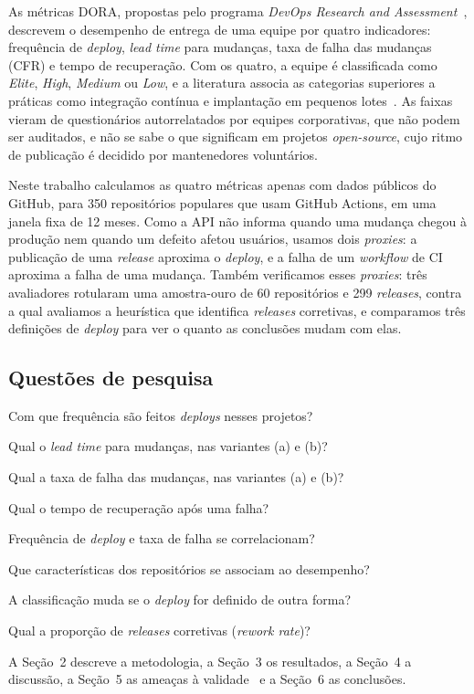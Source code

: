 
As métricas DORA, propostas pelo programa \textit{DevOps Research and
Assessment}~\cite{dora2024}, descrevem o desempenho de entrega de uma equipe por quatro
indicadores: frequência de \textit{deploy}, \textit{lead time} para mudanças, taxa de falha
das mudanças (CFR) e tempo de recuperação. Com os quatro, a equipe é classificada como
\textit{Elite}, \textit{High}, \textit{Medium} ou \textit{Low}, e a literatura associa as
categorias superiores a práticas como integração contínua e implantação em pequenos
lotes~\cite{forsgren2018}. As faixas vieram de questionários autorrelatados por equipes
corporativas, que não podem ser auditados, e não se sabe o que significam em projetos
\textit{open-source}, cujo ritmo de publicação é decidido por mantenedores voluntários.

Neste trabalho calculamos as quatro métricas apenas com dados públicos do GitHub, para 350
repositórios populares que usam GitHub Actions, em uma janela fixa de 12 meses. Como a API
não informa quando uma mudança chegou à produção nem quando um defeito afetou usuários,
usamos dois \textit{proxies}: a publicação de uma \textit{release} aproxima o
\textit{deploy}, e a falha de um \textit{workflow} de CI aproxima a falha de uma mudança.
Também verificamos esses \textit{proxies}: três avaliadores rotularam uma amostra-ouro de 60
repositórios e 299 \textit{releases}, contra a qual avaliamos a heurística que identifica
\textit{releases} corretivas, e comparamos três definições de \textit{deploy} para ver o
quanto as conclusões mudam com elas.

\subsection{Questões de pesquisa}

\begin{description}\itemsep0pt
\item[RQ 01] Com que frequência são feitos \textit{deploys} nesses projetos?
\item[RQ 02] Qual o \textit{lead time} para mudanças, nas variantes (a) e (b)?
\item[RQ 03] Qual a taxa de falha das mudanças, nas variantes (a) e (b)?
\item[RQ 04] Qual o tempo de recuperação após uma falha?
\item[RQ 05] Frequência de \textit{deploy} e taxa de falha se correlacionam?
\item[RQ 06] Que características dos repositórios se associam ao desempenho?
\item[RQ 07] A classificação muda se o \textit{deploy} for definido de outra forma?
\item[RQ 08] Qual a proporção de \textit{releases} corretivas (\textit{rework rate})?
\end{description}

A Seção~2 descreve a metodologia, a Seção~3 os resultados, a Seção~4 a discussão, a Seção~5
as ameaças à validade~\cite{wohlin2012} e a Seção~6 as conclusões.
